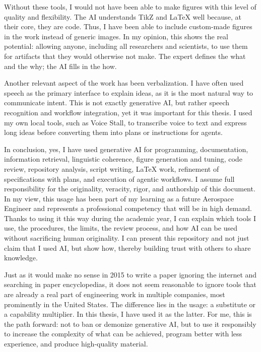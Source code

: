 Without these tools, I would not have been able to make figures with this level of quality and flexibility. The AI understands TikZ and LaTeX well because, at their core, they are code. Thus, I have been able to include custom-made figures in the work instead of generic images. In my opinion, this shows the real potential: allowing anyone, including all researchers and scientists, to use them for artifacts that they would otherwise not make. The expert defines the what and the why; the AI fills in the how.

Another relevant aspect of the work has been verbalization. I have often used speech as the primary interface to explain ideas, as it is the most natural way to communicate intent. This is not exactly generative AI, but rather speech recognition and workflow integration, yet it was important for this thesis. I used my own local tools, such as Voice Stall, to transcribe voice to text and express long ideas before converting them into plans or instructions for agents.

In conclusion, yes, I have used generative AI for programming, documentation, information retrieval, linguistic coherence, figure generation and tuning, code review, repository analysis, script writing, LaTeX work, refinement of specifications with plans, and execution of agentic workflows. I assume full responsibility for the originality, veracity, rigor, and authorship of this document. In my view, this usage has been part of my learning as a future Aerospace Engineer and represents a professional competency that will be in high demand. Thanks to using it this way during the academic year, I can explain which tools I use, the procedures, the limits, the review process, and how AI can be used without sacrificing human originality. I can present this repository and not just claim that I used AI, but show how, thereby building trust with others to share knowledge.

Just as it would make no sense in 2015 to write a paper ignoring the internet and searching in paper encyclopedias, it does not seem reasonable to ignore tools that are already a real part of engineering work in multiple companies, most prominently in the United States. The difference lies in the usage: a substitute or a capability multiplier. In this thesis, I have used it as the latter. For me, this is the path forward: not to ban or demonize generative AI, but to use it responsibly to increase the complexity of what can be achieved, program better with less experience, and produce high-quality material.
